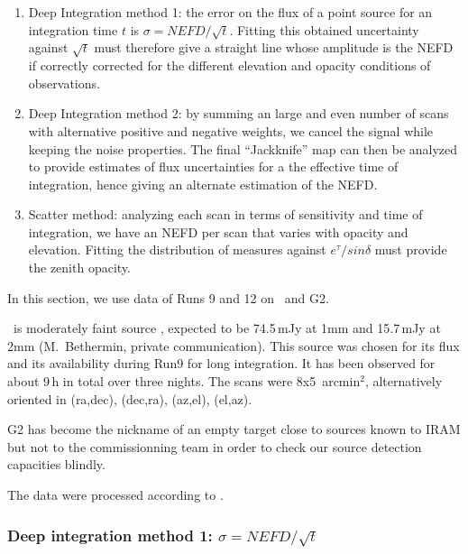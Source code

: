 \begin{enumerate}
\item Deep Integration method 1: the error on the flux of a point source for an
  integration time $t$ is $\sigma = NEFD/\sqrt{t}$. Fitting this obtained
  uncertainty against $\sqrt{t}$ must therefore give a straight line whose
  amplitude is the NEFD if correctly corrected for the different elevation and
  opacity conditions of observations.
\item Deep Integration method 2: by summing an large and even number of scans
  with alternative positive and negative weights, we cancel the signal while
  keeping the noise properties. The final ``Jackknife'' map can then be analyzed
  to provide estimates of flux uncertainties for a the effective time of
  integration, hence giving an alternate estimation of the NEFD.
\item Scatter method: analyzing each scan in terms of sensitivity and
  time of integration, we have an NEFD per scan that varies with opacity and
  elevation. Fitting the distribution of measures against $e^\tau/sin\delta$
  must provide the zenith opacity.
\end{enumerate}

In this section, we use data of Runs 9 and 12  on \hls\ and G2.

\hls\ is moderately faint source \cite{hls_combes}, expected to be 74.5\,mJy at
1mm and 15.7\,mJy at 2mm (M.~Bethermin, private communication). This source was
chosen for its flux and its availability during Run9 for long integration. It
has been observed for about 9\,h in total over three nights. The scans were
8x5~arcmin$^2$, alternatively oriented in (ra,dec), (dec,ra), (az,el), (el,az).

G2 has become the nickname of an empty target close to sources known to IRAM but
not to the commissionning team in order to check our source detection capacities blindly.

The data were processed according to .

\subsubsection{Deep integration method 1: $\sigma = NEFD/\sqrt{t}$}


